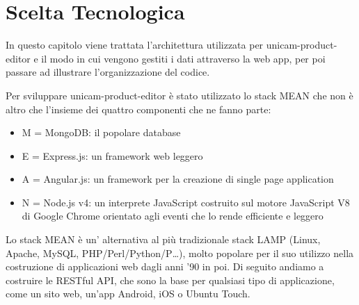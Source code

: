 \chapter{Scelta Tecnologica}
\label{chap:scelta}
In questo capitolo viene trattata l'architettura utilizzata per unicam-product-editor e il modo in cui vengono gestiti i dati attraverso la web app, per poi passare ad illustrare l'organizzazione del codice.

Per sviluppare unicam-product-editor è stato utilizzato lo stack MEAN che non è altro che l'insieme dei quattro componenti che ne fanno parte:
\begin{itemize}
	\item M = MongoDB: il popolare database
	\item E = Express.js: un framework web leggero
	\item A = Angular.js: un framework per la creazione di single page application
	\item N = Node.js v4: un interprete JavaScript costruito sul motore JavaScript V8 di Google Chrome orientato agli eventi che lo rende efficiente e leggero
\end{itemize}
Lo stack MEAN è un' alternativa al più tradizionale stack LAMP (Linux, Apache, MySQL, PHP/Perl/Python/P…), molto popolare per il suo utilizzo nella costruzione di applicazioni web dagli anni '90 in poi.
Di seguito andiamo a costruire le RESTful API, che sono la base per qualsiasi tipo di applicazione, come un sito web, un'app Android, iOS o Ubuntu Touch.

